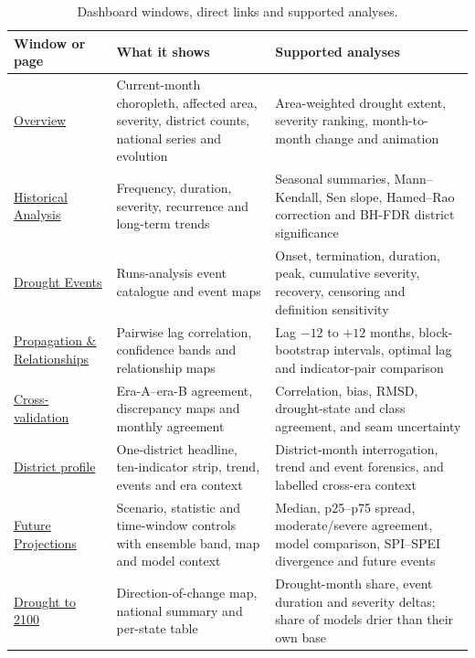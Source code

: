 \documentclass[11pt,a4paper]{article}
\begin{document}
\begin{table}[t]
\caption{Dashboard windows, direct links and supported analyses.}
\small
\begin{tabularx}{\textwidth}{@{}>{\RaggedRight\arraybackslash}p{}>{\RaggedRight\arraybackslash}p{}>{\RaggedRight\arraybackslash}X@{}}
\toprule
Window or page & What it shows & Supported analyses \\
\midrule
\href{https://drought.ankitdeshmukh.com/\#overview}{Overview} & Current-month choropleth, affected area, severity, district counts, national series and evolution & Area-weighted drought extent, severity ranking, month-to-month change and animation \\
\href{https://drought.ankitdeshmukh.com/\#historical}{Historical Analysis} & Frequency, duration, severity, recurrence and long-term trends & Seasonal summaries, Mann--Kendall, Sen slope, Hamed--Rao correction and BH-FDR district significance \\
\href{https://drought.ankitdeshmukh.com/\#events}{Drought Events} & Runs-analysis event catalogue and event maps & Onset, termination, duration, peak, cumulative severity, recovery, censoring and definition sensitivity \\
\href{https://drought.ankitdeshmukh.com/\#propagation}{Propagation \& Relationships} & Pairwise lag correlation, confidence bands and relationship maps & Lag $-12$ to $+12$ months, block-bootstrap intervals, optimal lag and indicator-pair comparison \\
\href{https://drought.ankitdeshmukh.com/\#crossval}{Cross-validation} & Era-A--era-B agreement, discrepancy maps and monthly agreement & Correlation, bias, RMSD, drought-state and class agreement, and seam uncertainty \\
\href{https://drought.ankitdeshmukh.com/\#/district/rajasthan-jodhpur}{District profile} & One-district headline, ten-indicator strip, trend, events and era context & District-month interrogation, trend and event forensics, and labelled cross-era context \\
\href{https://drought.ankitdeshmukh.com/\#projections}{Future Projections} & Scenario, statistic and time-window controls with ensemble band, map and model context & Median, p25--p75 spread, moderate/severe agreement, model comparison, SPI--SPEI divergence and future events \\
\href{https://drought.ankitdeshmukh.com/\#summary}{Drought to 2100} & Direction-of-change map, national summary and per-state table & Drought-month share, event duration and severity deltas; share of models drier than their own base \\

\end{tabularx}
\end{table}
\end{document}
